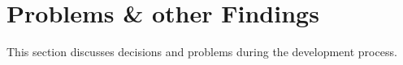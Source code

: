 
\section{Problems \& other Findings}
\label{sec:problems}

This section discusses decisions and problems during the development process.


						
